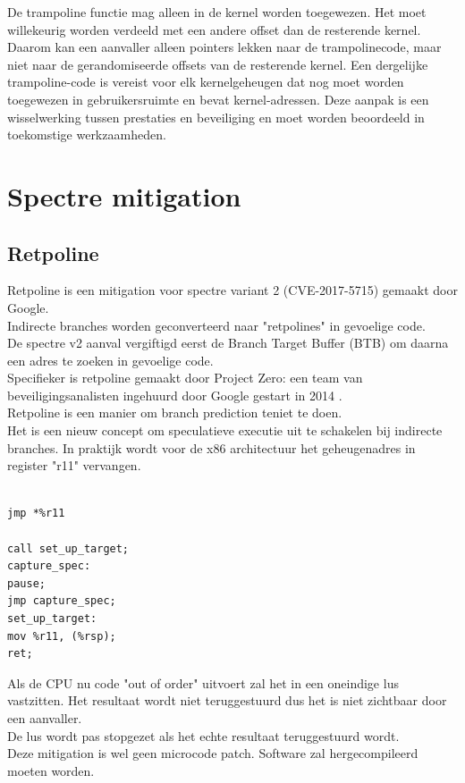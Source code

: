 De trampoline
functie mag alleen in de kernel worden toegewezen. Het moet
willekeurig worden  verdeeld met een andere offset dan de resterende
kernel. Daarom kan een aanvaller alleen pointers lekken
naar de trampolinecode, maar niet naar de gerandomiseerde offsets van
de resterende kernel. Een dergelijke trampoline-code is vereist
voor elk kernelgeheugen dat nog moet worden toegewezen in
gebruikersruimte en bevat kernel-adressen. Deze aanpak 
is een wisselwerking tussen prestaties en beveiliging en
moet worden beoordeeld in toekomstige werkzaamheden.

\section{Spectre mitigation}
\subsection{Retpoline}
Retpoline is een mitigation voor spectre variant 2 (CVE-2017-5715) gemaakt door Google.\\
Indirecte branches worden geconverteerd naar "retpolines" in gevoelige code.\\
De spectre v2 aanval vergiftigd eerst de Branch Target Buffer (BTB) om daarna een adres te zoeken in gevoelige code.\\
Specifieker is retpoline gemaakt door Project Zero: een team van beveiligingsanalisten ingehuurd door Google gestart in 2014 \parencite{Evans2014}.\\
Retpoline is een manier om branch prediction teniet te doen.\\
Het is een nieuw concept om speculatieve executie uit te schakelen bij indirecte branches.
In praktijk wordt voor de x86 architectuur het geheugenadres in register "r11" vervangen.


\begin{lstlisting}

jmp *%r11

call set_up_target;
capture_spec:         
pause;
jmp capture_spec;
set_up_target:
mov %r11, (%rsp);   
ret;    
\end{lstlisting}


              
\parencite{Turner2018}

Als de CPU nu code "out of order" uitvoert zal het in een oneindige lus vastzitten. Het resultaat wordt niet teruggestuurd dus het is niet zichtbaar door een aanvaller.\\
De lus wordt pas stopgezet als het echte resultaat teruggestuurd wordt.\\
Deze mitigation is wel geen microcode patch. Software zal hergecompileerd moeten worden.

